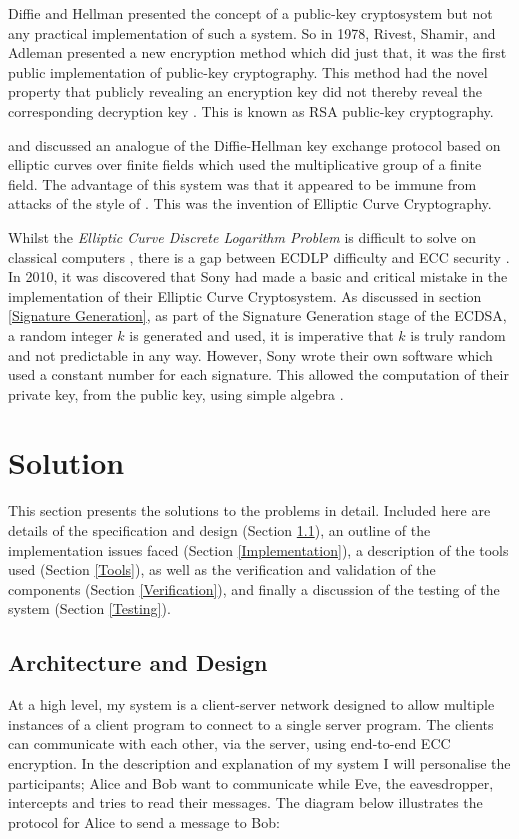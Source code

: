 \documentclass[12pt,a4paper]{article}
\begin{document}
Diffie and Hellman presented the concept of a public-key cryptosystem but not any practical implementation of such a system. 
So in 1978, Rivest, Shamir, and Adleman presented a new encryption method which did just that, it was the first public implementation of public-key cryptography. 
This method had the novel property that publicly revealing an encryption key did not thereby reveal the corresponding decryption key \cite{10.1145/359340.359342}. 
This is known as RSA public-key cryptography. 

\cite{10.1007/3-540-39799-X_31} and \cite{koblitz1987elliptic} discussed an analogue of the Diffie-Hellman key exchange protocol based on elliptic curves over finite fields which used the multiplicative group of a finite field. 
The advantage of this system was that it appeared to be immune from attacks of the style of \cite{10.1007/3-540-39799-X_31,4568001}. 
This was the invention of Elliptic Curve Cryptography. 

Whilst the \emph{Elliptic Curve Discrete Logarithm Problem} is difficult to solve on classical computers \cite{hankerson2003guide}, 
there is a gap between ECDLP difficulty and ECC security \cite{bernstein2013safecurves}. 
In 2010, it was discovered that Sony had made a basic and critical mistake in the implementation of their Elliptic Curve Cryptosystem. 
As discussed in section \ref{Signature Generation}, as part of the Signature Generation stage of the ECDSA, a random integer $k$ is generated and used, 
it is imperative that $k$ is truly random and not predictable in any way. 
However, Sony wrote their own software which used a constant number for each signature. 
This allowed the computation of their private key, from the public key, using simple algebra \cite{hotz2010console}.


\section{Solution}
This section presents the solutions to the problems in detail. 
Included here are details of the specification and design (Section \ref{Specification}), 
an outline of the implementation issues faced (Section \ref{Implementation}), 
a description of the tools used (Section \ref{Tools}), 
as well as the verification and validation of the components (Section \ref{Verification}), 
and finally a discussion of the testing of the system (Section \ref{Testing}). 

\subsection{Architecture and Design} \label{Specification}
At a high level, my system is a client-server network designed to allow 
multiple instances of a client program to connect to a single server program. 
The clients can communicate with each other, via the server, using end-to-end ECC encryption. 
In the description and explanation of my system I will personalise the participants; 
Alice and Bob want to communicate while Eve, the eavesdropper, intercepts and tries to read their messages. 
The diagram below illustrates the protocol for Alice to send a message to Bob: 
\end{document}
